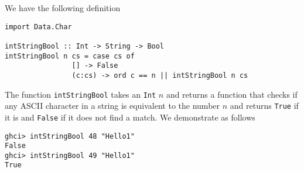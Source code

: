 
We have the following definition
\begin{verbatim}
import Data.Char

intStringBool :: Int -> String -> Bool
intStringBool n cs = case cs of
                [] -> False
                (c:cs) -> ord c == n || intStringBool n cs
\end{verbatim}

The function \verb|intStringBool| takes an \verb|Int| $n$ and returns a function
that checks if any ASCII character in a string is equivalent to the number $n$ and
returns \verb|True| if it is and \verb|False| if it does not find a match. We
demonstrate as follows
\begin{verbatim}
ghci> intStringBool 48 "Hello1"
False
ghci> intStringBool 49 "Hello1"
True
\end{verbatim}
